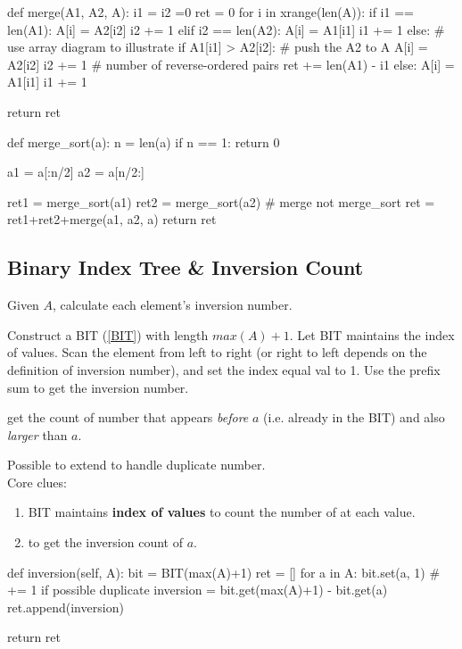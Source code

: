 \begin{python}
def merge(A1, A2, A):
  i1 = i2 =0
  ret = 0
  for i in xrange(len(A)):
    if i1 == len(A1):
      A[i] = A2[i2]
      i2 += 1
    elif i2 == len(A2):
      A[i] = A1[i1]
      i1 += 1
    else:
      # use array diagram to illustrate
      if A1[i1] > A2[i2]:  # push the A2 to A
        A[i] = A2[i2]
        i2 += 1
        # number of reverse-ordered pairs
        ret += len(A1) - i1
      else:
        A[i] = A1[i1]
        i1 += 1

  return ret

def merge_sort(a):
  n = len(a)
  if n == 1:
    return 0

  a1 = a[:n/2]
  a2 = a[n/2:]

  ret1 = merge_sort(a1)
  ret2 = merge_sort(a2)
  # merge not merge_sort
  ret = ret1+ret2+merge(a1, a2, a)  
  return ret
\end{python}

\subsection{Binary Index Tree \& Inversion Count}
Given $A$, calculate each element's inversion number. 

Construct a BIT (\ref{BIT}) with length $max(A)+1$. Let BIT maintains the index of values. Scan the element from left to right (or right to left depends on the definition of inversion number), and set the index equal val to 1. Use the prefix sum to get the inversion number.

 get the count of number that appears \textit{before} $a$ (i.e. already in the BIT) and also \textit{larger} than $a$. 

Possible to extend to handle duplicate number. 
\\
Core clues:
\begin{enumerate}
\item BIT maintains \textbf{index of values} to count the number of at each value.
\item {} to get the inversion count of $a$.
\end{enumerate}
\begin{python}
def inversion(self, A):
    bit = BIT(max(A)+1)
    ret = []
    for a in A:
        bit.set(a, 1)  # += 1 if possible duplicate 
        inversion = bit.get(max(A)+1) - bit.get(a)
        ret.append(inversion)

    return ret
\end{python}


